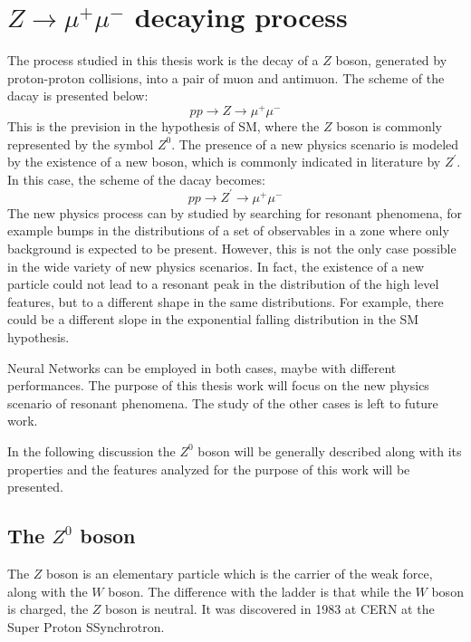 \chapter{$Z \rightarrow \mu^{+}\mu^{-}$ decaying process}

The process studied in this thesis work is the decay of a $Z$ boson, generated by proton-proton collisions, into a pair of muon and antimuon. The scheme of the dacay is presented below:
\begin{equation}
	pp \rightarrow Z \rightarrow \mu^{+}\mu^{-}
\end{equation}
This is the prevision in the hypothesis of SM, where the $Z$ boson is commonly represented by the symbol $Z^{0}$. The presence of a new physics scenario is modeled by the existence of a new boson, which is commonly indicated in literature by $Z^{\prime}$. In this case, the scheme of the dacay becomes:
\begin{equation}
	pp \rightarrow Z^{\prime} \rightarrow \mu^{+}\mu^{-}
\end{equation}
The new physics process can by studied by searching for resonant phenomena, for example bumps in the distributions of a set of observables in a zone where only background is expected to be present. However, this is not the only case possible in the wide variety of new physics scenarios. In fact, the existence of a new particle could not lead to a resonant peak in the distribution of the high level features, but to a different shape in the same distributions. For example, there could be a different slope in the exponential falling distribution in the SM hypothesis.

Neural Networks can be employed in both cases, maybe with different performances. The purpose of this thesis work will focus on the new physics scenario of resonant phenomena. The study of the other cases is left to future work.

In the following discussion the $Z^{0}$ boson will be generally described along with its properties and the features analyzed for the purpose of this work will be presented.





\section{The $Z^{0}$ boson}
The $Z$ boson is an elementary particle which is the carrier of the weak force, along with the $W$ boson. The difference with the ladder is that while the $W$ boson is charged, the $Z$ boson is neutral. It was discovered in 1983 at CERN at the Super Proton SSynchrotron.

